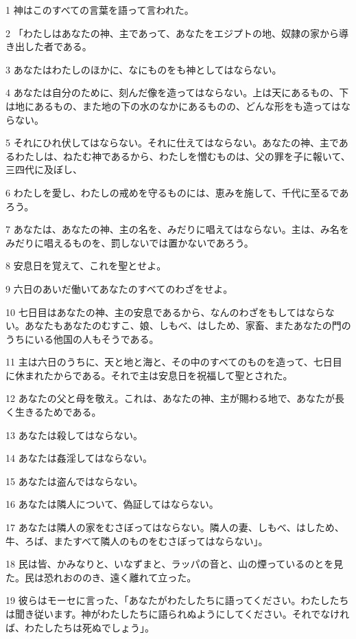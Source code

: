 \par 1 神はこのすべての言葉を語って言われた。
\par 2 「わたしはあなたの神、主であって、あなたをエジプトの地、奴隷の家から導き出した者である。
\par 3 あなたはわたしのほかに、なにものをも神としてはならない。
\par 4 あなたは自分のために、刻んだ像を造ってはならない。上は天にあるもの、下は地にあるもの、また地の下の水のなかにあるものの、どんな形をも造ってはならない。
\par 5 それにひれ伏してはならない。それに仕えてはならない。あなたの神、主であるわたしは、ねたむ神であるから、わたしを憎むものは、父の罪を子に報いて、三四代に及ぼし、
\par 6 わたしを愛し、わたしの戒めを守るものには、恵みを施して、千代に至るであろう。
\par 7 あなたは、あなたの神、主の名を、みだりに唱えてはならない。主は、み名をみだりに唱えるものを、罰しないでは置かないであろう。
\par 8 安息日を覚えて、これを聖とせよ。
\par 9 六日のあいだ働いてあなたのすべてのわざをせよ。
\par 10 七日目はあなたの神、主の安息であるから、なんのわざをもしてはならない。あなたもあなたのむすこ、娘、しもべ、はしため、家畜、またあなたの門のうちにいる他国の人もそうである。
\par 11 主は六日のうちに、天と地と海と、その中のすべてのものを造って、七日目に休まれたからである。それで主は安息日を祝福して聖とされた。
\par 12 あなたの父と母を敬え。これは、あなたの神、主が賜わる地で、あなたが長く生きるためである。
\par 13 あなたは殺してはならない。
\par 14 あなたは姦淫してはならない。
\par 15 あなたは盗んではならない。
\par 16 あなたは隣人について、偽証してはならない。
\par 17 あなたは隣人の家をむさぼってはならない。隣人の妻、しもべ、はしため、牛、ろば、またすべて隣人のものをむさぼってはならない」。
\par 18 民は皆、かみなりと、いなずまと、ラッパの音と、山の煙っているのとを見た。民は恐れおののき、遠く離れて立った。
\par 19 彼らはモーセに言った、「あなたがわたしたちに語ってください。わたしたちは聞き従います。神がわたしたちに語られぬようにしてください。それでなければ、わたしたちは死ぬでしょう」。
